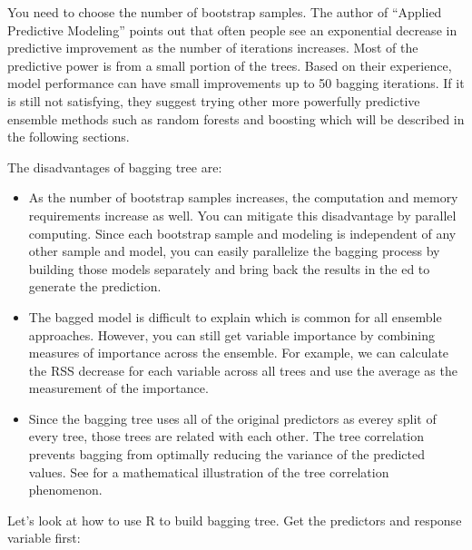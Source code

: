 \documentclass[
  12pt,
]{krantz}
\makeatletter
\newenvironment{Shaded}{\begin{snugshade}}{\end{snugshade}}
\newcommand{\CommentTok}[1]{\textcolor[rgb]{0.37,0.37,0.37}{\textit{#1}}}
\newcommand{\FunctionTok}[1]{\textcolor[rgb]{0,0,0}{#1}}
\newcommand{\NormalTok}[1]{#1}
\newcommand{\OtherTok}[1]{\textcolor[rgb]{0.37,0.37,0.37}{#1}}
\newcommand{\SpecialCharTok}[1]{\textcolor[rgb]{0,0,0}{#1}}
\newcommand{\StringTok}[1]{\textcolor[rgb]{0.5,0.5,0.5}{#1}}
\newenvironment{kframe}{%
\medskip{}
\setlength{\fboxsep}{.8em}
 \def\at@end@of@kframe{}%
 \ifinner\ifhmode%
  \def\at@end@of@kframe{\end{minipage}}%
  \begin{minipage}{\columnwidth}%
 \fi\fi%
 \def\FrameCommand##1{\hskip\@totalleftmargin \hskip-\fboxsep
 \colorbox{shadecolor}{##1}\hskip-\fboxsep
     \hskip-\linewidth \hskip-\@totalleftmargin \hskip\columnwidth}%
 \MakeFramed {\advance\hsize-\width
   \@totalleftmargin\z@ \linewidth\hsize
   \@setminipage}}%
 {\par\unskip\endMakeFramed%
 \at@end@of@kframe}
\renewenvironment{Shaded}{\begin{kframe}}{\end{kframe}}
\makeatother
\begin{document}
You need to choose the number of bootstrap samples. The author of ``Applied Predictive Modeling'' \citep{APM} points out that often people see an exponential decrease in predictive improvement as the number of iterations increases. Most of the predictive power is from a small portion of the trees. Based on their experience, model performance can have small improvements up to 50 bagging iterations. If it is still not satisfying, they suggest trying other more powerfully predictive ensemble methods such as random forests and boosting which will be described in the following sections.

The disadvantages of bagging tree are:

\begin{itemize}
\item
  As the number of bootstrap samples increases, the computation and memory requirements increase as well. You can mitigate this disadvantage by parallel computing. Since each bootstrap sample and modeling is independent of any other sample and model, you can easily parallelize the bagging process by building those models separately and bring back the results in the ed to generate the prediction.
\item
  The bagged model is difficult to explain which is common for all ensemble approaches. However, you can still get variable importance by combining measures of importance across the ensemble. For example, we can calculate the RSS decrease for each variable across all trees and use the average as the measurement of the importance.
\item
  Since the bagging tree uses all of the original predictors as everey split of every tree, those trees are related with each other. The tree correlation prevents bagging from optimally reducing the variance of the predicted values. See \citep{Hastie2008} for a mathematical illustration of the tree correlation phenomenon.
\end{itemize}

Let's look at how to use R to build bagging tree. Get the predictors and response variable first:

\begin{Shaded}
\end{Shaded}
\end{document}
